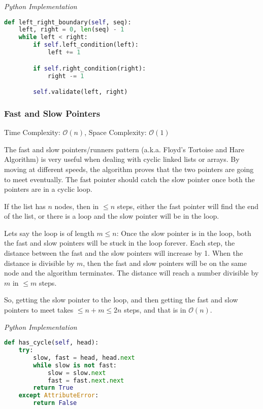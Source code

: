 \documentclass{article}
\newcommand{\bigO}{\mathcal{O}}
\begin{document}
\vspace{8pt} \emph{Python Implementation}
\begin{lstlisting}[language=Python]
def left_right_boundary(self, seq):
    left, right = 0, len(seq) - 1
    while left < right:
        if self.left_condition(left):
            left += 1

        if self.right_condition(right):
            right -= 1

        self.validate(left, right)
\end{lstlisting}
    
    \subsubsection{Fast and Slow Pointers}
    Time Complexity: $\bigO(n)$, Space Complexity: $\bigO(1)$
    
    The fast and slow pointers/runners pattern (a.k.a. Floyd’s Tortoise and Hare Algorithm) is very useful when dealing with cyclic linked lists or arrays. By moving at different speeds, the algorithm proves that the two pointers are going to meet eventually. The fast pointer should catch the slow pointer once both the pointers are in a cyclic loop.
     
    If the list has $n$ nodes, then in $\leq n$ steps, either the fast pointer will find the end of the list, or there is a loop and the slow pointer will be in the loop.
    
    Lets say the loop is of length $m \leq n$: Once the slow pointer is in the loop, both the fast and slow pointers will be stuck in the loop forever. Each step, the distance between the fast and the slow pointers will increase by 1. When the distance is divisible by $m$, then the fast and slow pointers will be on the same node and the algorithm terminates. The distance will reach a number divisible by $m$ in $\leq m$ steps.

    So, getting the slow pointer to the loop, and then getting the fast and slow pointers to meet takes $\leq n + m \leq 2n$ steps, and that is in $\bigO(n)$.

\vspace{8pt} \emph{Python Implementation}
\begin{lstlisting}[language=Python]
def has_cycle(self, head):
    try:
        slow, fast = head, head.next
        while slow is not fast:
            slow = slow.next
            fast = fast.next.next
        return True
    except AttributeError:
        return False
\end{lstlisting}
\end{document}
